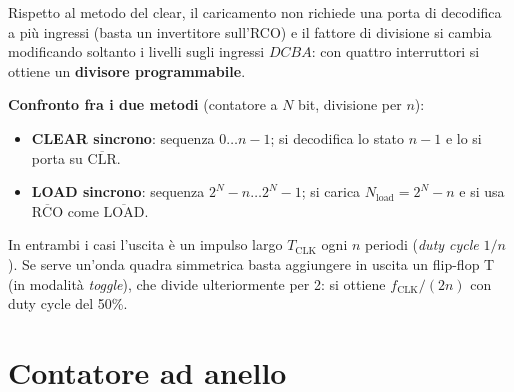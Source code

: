 \begin{center}
\end{center}

\noindent Rispetto al metodo del clear, il caricamento non richiede una porta di
decodifica a più ingressi (basta un invertitore sull'RCO) e il fattore di divisione si
cambia modificando soltanto i livelli sugli ingressi $DCBA$: con quattro interruttori si
ottiene un \textbf{divisore programmabile}.

\begin{important}
\textbf{Confronto fra i due metodi} (contatore a $N$ bit, divisione per $n$):
\begin{itemize}[leftmargin=1.3em, itemsep=2pt]
    \item \textbf{CLEAR sincrono}: sequenza $0 \ldots n-1$; si decodifica lo stato $n-1$ e
          lo si porta su $\overline{\text{CLR}}$.
    \item \textbf{LOAD sincrono}: sequenza $2^N-n \ldots 2^N-1$; si carica
          $N_{\text{load}}=2^N-n$ e si usa $\overline{\text{RCO}}$ come
          $\overline{\text{LOAD}}$.
\end{itemize}
In entrambi i casi l'uscita è un impulso largo $T_{\text{CLK}}$ ogni $n$ periodi
(\emph{duty cycle} $1/n$). Se serve un'onda quadra simmetrica basta aggiungere in uscita un
flip-flop T (in modalità \emph{toggle}), che divide ulteriormente per 2: si ottiene
$f_{\text{CLK}}/(2n)$ con duty cycle del 50\%.
\end{important}

\section{Contatore ad anello}

